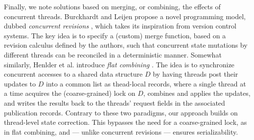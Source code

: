 Finally, we note solutions based on merging, or combining, the effects of concurrent threads. Burckhardt and Leijen propose a novel programming model, dubbed \emph{concurrent revisions} \cite{ConcRevisionsSPAA}, which takes its inspiration from version control systems. The key idea is to specify a (custom) merge function, based on a revision calculus defined by the authors, such that concurrent state mutations by different threads can be reconciled in a deterministic manner. Somewhat similarly, Henlder et al. introduce \emph{flat combining} \cite{FlatCombiningSPAA}. The idea is to synchronize concurrent accesses to a shared data structure $D$ by having threads post their updates to $D$ into a common list as thead-local records, where a single thread at a time acquires the (coarse-grained) lock on $D$, combines and applies the updates, and writes the results back to the threads' request fields in the associated publication records. Contrary to these two paradigms, our approach builds on thread-level state correction. This bypasses the need for a coarse-grained lock, as in flat combining, and --- unlike concurrent revisions --- ensures serializability. 






